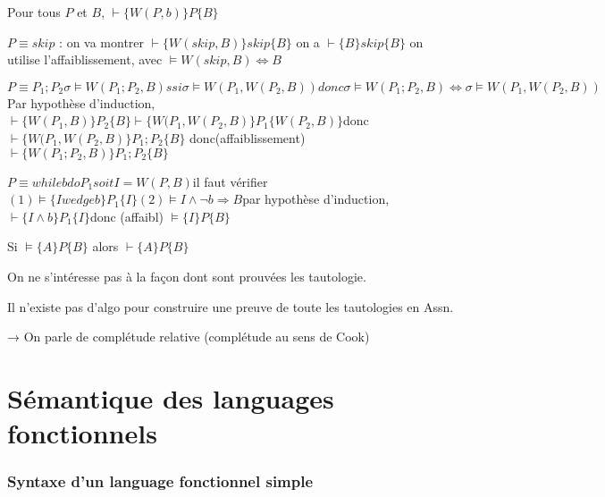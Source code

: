 \documentclass[10pt,a4paper]{article}
\newcommand{\semh}[3]{\{#1\}#2\{#3\}}
\begin{document}
\begin{lem}
 Pour tous $P$ et $B$, $\vdash \semh{W(P,b)}{P}{B}$
\end{lem}
\begin{dem}
$P \equiv skip$ : on va montrer $\vdash \semh{W(skip,B)}{skip}{B}$
	on a $\vdash \semh{B}{skip}{B}$
    on utilise l'affaiblissement, avec $\models W(skip,B) \Leftrightarrow B$

$P \equiv P_1; P_2
	\sigma \models W(P_1;P_2,B) ssi \sigma \models W(P_1,W(P_2,B))
      donc \sigma \models W(P_1;P_2,B) \Leftrightarrow \sigma \models W(P_1,W(P_2,B))$
Par hypothèse d'induction, $\vdash \semh{W(P_1,B)}{P_2}{B}
			   \vdash \semh{W(P_1,W(P_2,B)}{P_1}{W(P_2,B)}
	  $donc $\vdash \semh{W(P_1,W(P_2,B)}{P_1;P_2}{B}
	 $ donc(affaiblissement) $\vdash \semh{W(P_1;P_2,B)}{P_1;P_2}{B}$


$P \equiv while b do P_1
      soit I = W(P,B)
       $il faut vérifier $(1) \models \semh{I wedge b}{P_1}{I}
			(2) \models I \wedge \lnot b \Rightarrow B
	$par hypothèse d'induction, $\vdash \semh{I \wedge b}{P_1}{I}
		      $donc (affaibl) $\models \semh{I}{P}{B}
$

\end{dem}
\begin{thm}[de complétude]
 Si $\models \semh{A}{P}{B}$ alors $\vdash \semh{A}{P}{B}$
\end{thm}
\begin{rem}
 On ne s'intéresse pas à la façon dont sont prouvées les tautologie.
\end{rem}
\begin{thm}
 Il n'existe pas d'algo pour construire une preuve de toute les tautologies en Assn.
\end{thm}

→ On parle de complétude relative (complétude au sens de Cook)


\part{Sémantique des languages fonctionnels}

\section{Syntaxe d'un language fonctionnel simple}
\end{document}
